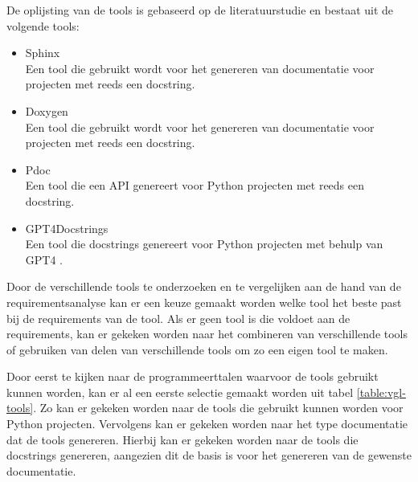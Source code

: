 De oplijsting van de tools is gebaseerd op de literatuurstudie en bestaat uit de volgende tools:
\begin{itemize}
\item Sphinx \autocite{Sphinx2023}\\
Een tool die gebruikt wordt voor het genereren van documentatie voor projecten met reeds een docstring. 
\item Doxygen \autocite{Doxygen2023}\\
Een tool die gebruikt wordt voor het genereren van documentatie voor projecten met reeds een docstring.
\item Pdoc \autocite{GallantHils2023}\\
Een tool die een API genereert voor Python projecten met reeds een docstring.
\item GPT4Docstrings \autocite{Trofficus2023}\\
Een tool die docstrings genereert voor Python projecten met behulp van GPT4 \textcite{OpenAI2023}.
\end{itemize}

Door de verschillende tools te onderzoeken en te vergelijken aan de hand van de requirementsanalyse kan er een keuze gemaakt worden welke tool het beste past bij de requirements van de tool.
Als er geen tool is die voldoet aan de requirements, kan er gekeken worden naar het combineren van verschillende tools of gebruiken van delen van verschillende tools om zo een eigen tool te maken.

Door eerst te kijken naar de programmeerttalen waarvoor de tools gebruikt kunnen worden, kan er al een eerste selectie gemaakt worden uit tabel \ref{table:vgl-tools}.
Zo kan er gekeken worden naar de tools die gebruikt kunnen worden voor Python projecten.
Vervolgens kan er gekeken worden naar het type documentatie dat de tools genereren.
Hierbij kan er gekeken worden naar de tools die docstrings genereren, aangezien dit de basis is voor het genereren van de gewenste documentatie.

\begin{table}[h!]
\centering
{}
\caption{Requirementsanalyse van de verschillende tools}
\label{table:ra-tools}
\end{table}

